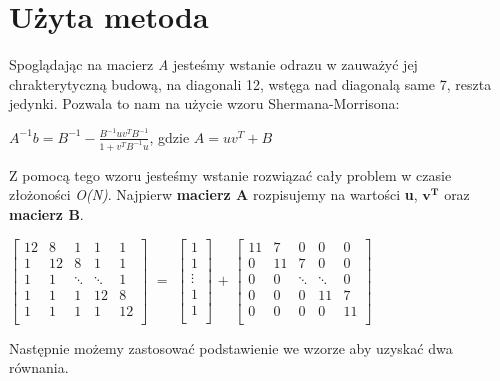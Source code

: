\documentclass{article}
\begin{document}
  \section{Użyta metoda}
  Spoglądając na macierz \textit{A} jesteśmy wstanie odrazu w zauważyć jej chrakterytyczną budową, na diagonali 12, wstęga nad diagonalą same 7, reszta jedynki. Pozwala to nam na użycie wzoru Shermana-Morrisona:
  \begin{center}
    {\large$A^{-1}b= B^{-1} - \frac{ B^{-1}uv^TB^{-1} }{ 1 + v^TB^{-1}u }$}, \qquad gdzie $A = uv^T + B$
  \end{center}
  Z pomocą tego wzoru jesteśmy wstanie rozwiązać cały problem w czasie złożoności \textit{O(N)}. Najpierw \textbf{macierz A} rozpisujemy na wartości \textbf{u}, \textbf{$\mathbf{v^T}$} oraz \textbf{macierz B}.
  \begin{center}
    $\begin{bmatrix}
      12 & 8 & 1 & 1 & 1 \\
      1 & 12 & 8 & 1 & 1 \\
      1 & 1 & \ddots & \ddots & 1 \\
      1 & 1 & 1 & 12 & 8 \\
      1 & 1 & 1 & 1 & 12 \\
    \end{bmatrix}$
    $=$ 
    $\begin{bmatrix}
      1 \\
      1 \\
      \vdots \\
      1 \\
      1 \\
    \end{bmatrix}$
    \raisebox{0.9cm}{
    $\begin{bmatrix}
      1 & 1 & \cdots & 1 & 1 \\
    \end{bmatrix}$}
    $+$
    $\begin{bmatrix}
      11 & 7 & 0 & 0 & 0 \\
      0 & 11 & 7 & 0 & 0 \\
      0 & 0 & \ddots & \ddots & 0 \\
      0 & 0 & 0 & 11 & 7 \\
      0 & 0 & 0 & 0 & 11 \\
    \end{bmatrix}$
  \end{center}
  Następnie możemy zastosować podstawienie we wzorze aby uzyskać dwa równania.
\end{document}
